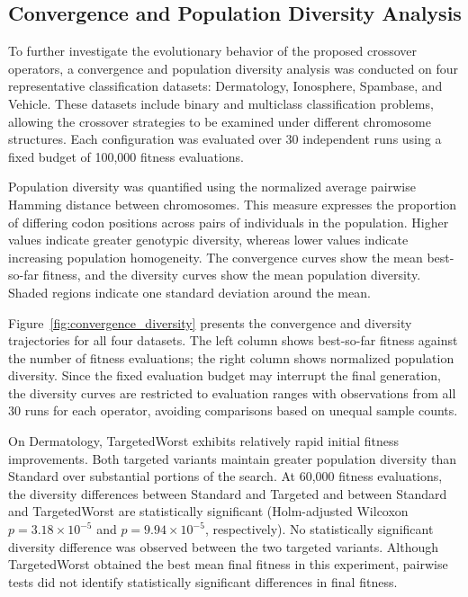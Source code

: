 \subsection{Convergence and Population Diversity Analysis}
\label{subsec:convergence_diversity}

To further investigate the evolutionary behavior of the proposed crossover operators, a convergence and population diversity analysis was conducted on four representative classification datasets: Dermatology, Ionosphere, Spambase, and Vehicle. These datasets include binary and multiclass classification problems, allowing the crossover strategies to be examined under different chromosome structures. Each configuration was evaluated over 30 independent runs using a fixed budget of 100,000 fitness evaluations.

Population diversity was quantified using the normalized average pairwise Hamming distance between chromosomes. This measure expresses the proportion of differing codon positions across pairs of individuals in the population. Higher values indicate greater genotypic diversity, whereas lower values indicate increasing population homogeneity. The convergence curves show the mean best-so-far fitness, and the diversity curves show the mean population diversity. Shaded regions indicate one standard deviation around the mean.

Figure~\ref{fig:convergence_diversity} presents the convergence and diversity trajectories for all four datasets. The left column shows best-so-far fitness against the number of fitness evaluations; the right column shows normalized population diversity. Since the fixed evaluation budget may interrupt the final generation, the diversity curves are restricted to evaluation ranges with observations from all 30 runs for each operator, avoiding comparisons based on unequal sample counts.

On Dermatology, TargetedWorst exhibits relatively rapid initial fitness improvements. Both targeted variants maintain greater population diversity than Standard over substantial portions of the search. At 60,000 fitness evaluations, the diversity differences between Standard and Targeted and between Standard and TargetedWorst are statistically significant (Holm-adjusted Wilcoxon $p=3.18\times10^{-5}$ and $p=9.94\times10^{-5}$, respectively). No statistically significant diversity difference was observed between the two targeted variants. Although TargetedWorst obtained the best mean final fitness in this experiment, pairwise tests did not identify statistically significant differences in final fitness.

